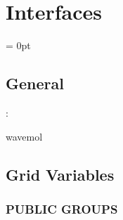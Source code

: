 
\section{Interfaces} 


\parskip = 0pt

\vspace{3mm} \subsection*{General}

: 

wavemol
\vspace{2mm}
\subsection*{Grid Variables}
\vspace{5mm}\subsubsection{PUBLIC GROUPS}

\vspace{5mm}

